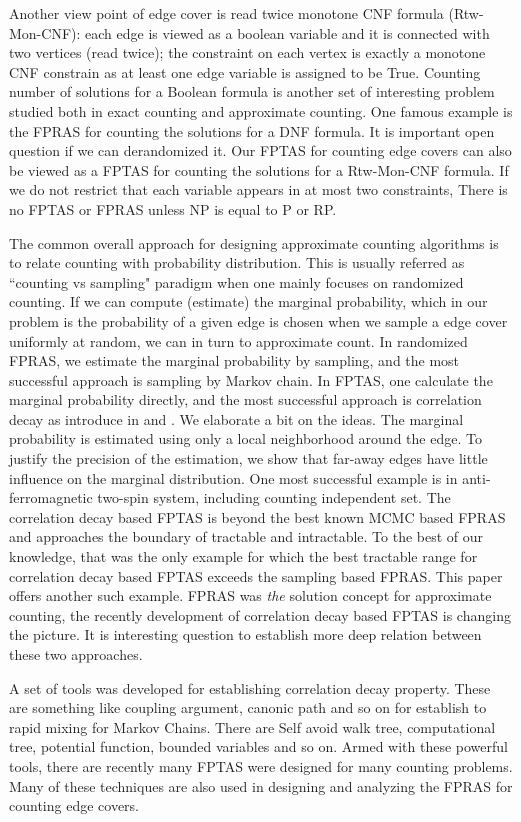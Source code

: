 Another view point of edge cover is read twice monotone CNF formula (Rtw-Mon-CNF): each edge is viewed as a boolean variable and it is connected with two vertices (read twice); the constraint on each vertex is exactly a monotone CNF constrain as at least one edge variable is assigned to be True. Counting number of solutions for a Boolean formula is another set of interesting problem studied both in exact counting and approximate counting. One famous example is the FPRAS for counting the solutions for a  DNF formula. It is important open question if we can derandomized it. Our FPTAS for counting edge covers can also be viewed as a FPTAS for counting the solutions for a  Rtw-Mon-CNF formula. If we do not restrict that each variable appears in at most two constraints, There is no FPTAS or FPRAS unless NP is equal to P or RP.  

The common overall approach for designing approximate counting algorithms is to relate counting with probability distribution. 
 This is usually referred as ``counting vs sampling" paradigm when one mainly focuses on randomized counting.  If we can compute (estimate) the marginal probability, which in our problem is the probability of a given edge is chosen when we sample a edge cover uniformly at random, we can in turn to approximate count. In randomized FPRAS, we estimate the marginal probability by sampling, and the most successful approach is sampling by Markov chain.
In FPTAS, one calculate the marginal probability directly, and the most successful approach is correlation decay as introduce in \cite{BG08} and \cite{Weitz06}. We elaborate a bit on the ideas. 
 The marginal probability is estimated using only a local neighborhood around the edge. To justify the precision of the estimation, we show that far-away edges have little influence on the marginal distribution.
One most successful example is in anti-ferromagnetic two-spin system, including counting independent set. 
The correlation decay based FPTAS is beyond the best known MCMC based FPRAS and approaches the boundary of tractable and intractable. 
To the best of our knowledge, that was the only example for which the best tractable range for correlation decay based FPTAS exceeds the sampling based FPRAS. This paper offers another such example. FPRAS was \emph{the} solution concept for approximate counting, the recently development of correlation decay based FPTAS is changing the picture. It is interesting question to establish more deep relation between these two approaches.

A set of tools was developed for establishing correlation decay property. These are something like coupling argument, canonic path and so on for establish to rapid mixing for Markov Chains.
There are Self avoid walk tree, computational tree, potential function, bounded variables and so on. Armed with these powerful tools, there are recently many FPTAS were designed for many counting problems. 
Many of these techniques are also used in designing and analyzing the FPRAS for counting edge covers.  

